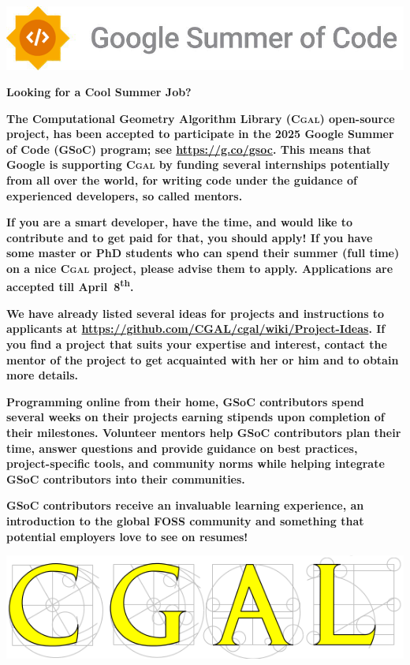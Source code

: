 \documentclass[12pt,a4paper]{article}
\newcommand{\cgal}{\textsc{Cgal}}
\begin{document}
\begin{framed}
  \vspace{10pt}
  \newlength{\cgalwidth}\setlength{\cgalwidth}{\linewidth}
  \includegraphics[width=\cgalwidth]{../../images/gsoc/GSoC-Horizontal.png}
  \begin{center}
    \textbf{\Huge Looking for a Cool Summer Job?}
  \end{center}
  \textbf{\large The Computational Geometry Algorithm Library
    (\cgal{}) open-source project, has been accepted to participate in
    the 2025 Google Summer of Code (GSoC) program; see
    \url{https://g.co/gsoc}.  This means that
    Google is supporting \cgal{} by funding several internships
    potentially from all over the world, for writing code under the
    guidance of experienced developers, so called mentors.}

  \textbf{{\large If you are a smart developer, have the time, and
    would like to contribute and to get paid for that, you should
    apply! If you have some master or PhD students who can spend their
    summer (full time) on a nice \cgal{} project, please advise them
    to apply.} Applications are accepted till April~8\textsuperscript{th}.}

  \textbf{\large We have already listed several ideas for projects and
    instructions to applicants at
    \url{https://github.com/CGAL/cgal/wiki/Project-Ideas}. If you
    find a project that suits your expertise and interest, contact the
    mentor of the project to get acquainted with her or him and to
    obtain more details.}

  \textbf{Programming online from their home, GSoC contributors spend
    several weeks on their projects earning stipends upon completion of
    their milestones.  Volunteer mentors help GSoC contributors plan
    their time, answer questions and provide guidance on best
    practices, project-speciﬁc tools, and community norms while
    helping integrate GSoC contributors into their communities.}

  \textbf{GSoC contributors receive an invaluable learning experience,
    an introduction to the global FOSS community and something that
    potential employers love to see on resumes!}

  \centering\includegraphics[width=\cgalwidth]{../../images/cgal_front_page_2013.png}
\end{framed}
\end{document}

